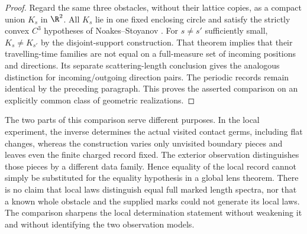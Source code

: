 \begin{proof}
Regard the same three obstacles, without their lattice copies, as a
compact union $K_s$ in $\R^2$.  All $K_s$ lie in one fixed enclosing
circle and satisfy the strictly convex $C^3$ hypotheses of
Noakes--Stoyanov \cite[Theorem~1.1]{NoakesStoyanov2020}.  For $s\ne s'$
sufficiently small, $K_s\ne K_{s'}$ by the disjoint-support construction.
That theorem implies that their travelling-time families are not equal
on a full-measure set of incoming positions and directions.  Its
separate scattering-length conclusion gives the analogous distinction
for incoming/outgoing direction pairs.  The periodic records remain
identical by the preceding paragraph.  This proves the asserted
comparison on an explicitly common class of geometric realizations.
\end{proof}

The two parts of this comparison serve different purposes.  In the local
experiment, the inverse determines the actual visited contact germs,
including flat changes, whereas the construction varies only unvisited
boundary pieces and leaves even the finite charged record fixed.  The
exterior observation distinguishes those pieces by a different data
family.  Hence equality of the local record cannot simply be substituted
for the equality hypothesis in a global lens theorem.  There is no claim
that local laws distinguish equal full marked length spectra, nor that a
known whole obstacle and the supplied marks could not generate its local
laws.  The comparison sharpens the local determination statement without
weakening it and without identifying the two observation models.
